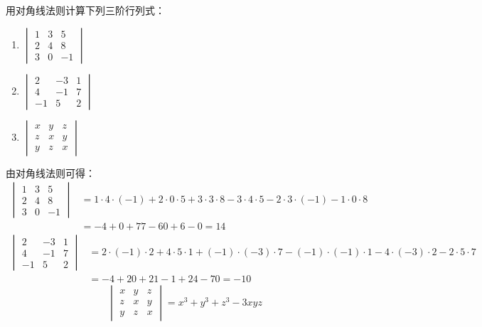 \begin{example}
    用对角线法则计算下列三阶行列式：
\begin{multicols}{3}
\begin{enumerate}
    \item $\begin{vmatrix}
        1&3&5\\2&4&8\\3&0&-1
    \end{vmatrix}$
    \item $\begin{vmatrix}
        2&-3&1\\4&-1&7\\-1&5&2
    \end{vmatrix}$
    \item $\begin{vmatrix}
        x&y&z\\z&x&y\\y&z&x
    \end{vmatrix}$
\end{enumerate} 
\end{multicols}
\end{example}

\begin{solution}
由对角线法则可得：
\[\begin{split}
    \begin{vmatrix}
        1&3&5\\2&4&8\\3&0&-1
    \end{vmatrix}&=1\cdot 4\cdot (-1)+2\cdot 0\cdot 5+3\cdot 3\cdot8-3\cdot4\cdot5-2\cdot 3\cdot (-1)-1\cdot 0\cdot 8\\
    &=-4+0+77-60+6-0=14
\end{split}\]
\[\begin{split}
    \begin{vmatrix}
        2&-3&1\\4&-1&7\\-1&5&2
    \end{vmatrix}&=2\cdot(-1)\cdot2+4\cdot5\cdot1+(-1)\cdot(-3)\cdot7-(-1)\cdot(-1)\cdot1-4\cdot(-3)\cdot2-2\cdot5\cdot7\\
    &=-4+20+21-1+24-70=-10
\end{split}\]
\[\begin{vmatrix}
    x&y&z\\z&x&y\\y&z&x
\end{vmatrix}=x^3+y^3+z^3-3xyz\]
\end{solution}

